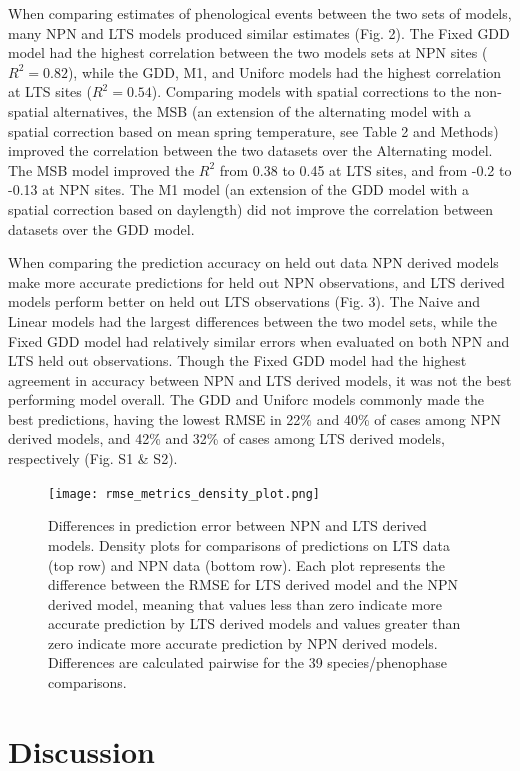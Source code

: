 \documentclass[fleqn,10pt,lineno]{wlpeerj} %
\begin{document}
When comparing estimates of phenological events between the two sets of models, many NPN and LTS models produced similar estimates (Fig. 2). The Fixed GDD model had the highest correlation between the two models sets at NPN sites ($R^2 = 0.82$), while the GDD, M1, and Uniforc models had the highest correlation at LTS sites ($R^2 = 0.54$). Comparing models with spatial corrections to the non-spatial alternatives, the MSB (an extension of the alternating model with a spatial correction based on mean spring temperature, see Table 2 and Methods) improved the correlation between the two datasets over the Alternating model. The MSB model improved the $R^2$ from 0.38 to 0.45 at LTS sites, and from -0.2 to -0.13 at NPN sites. The M1 model (an extension of the GDD model with a spatial correction based on daylength) did not improve the correlation between datasets over the GDD model. 

When comparing the prediction accuracy on held out data NPN derived models make more accurate predictions for held out NPN observations, and LTS derived models perform better on held out LTS observations (Fig. 3). The Naive and Linear models had the largest differences between the two model sets, while the Fixed GDD model had relatively similar errors when evaluated on both NPN and LTS held out observations. Though the Fixed GDD model had the highest agreement in accuracy between NPN and LTS derived models, it was not the best performing model overall. The GDD and Uniforc models commonly made the best predictions, having the lowest RMSE in 22\% and 40\% of cases among NPN derived models, and 42\% and 32\% of cases among LTS derived models, respectively (Fig. S1 \& S2).

\begin{figure}
	\centering
		\texttt{[image: rmse\_metrics\_density\_plot.png]}
	\caption{Differences in prediction error between NPN and LTS derived models. Density plots for comparisons of predictions on LTS data (top row) and NPN data (bottom row). Each plot represents the difference between the RMSE for LTS derived model and the NPN derived model, meaning that values less than zero indicate more accurate prediction by LTS derived models and values greater than zero indicate more accurate prediction by NPN derived models. Differences are calculated pairwise for the 39 species/phenophase comparisons.}
\end{figure}


\section*{Discussion}
\end{document}
